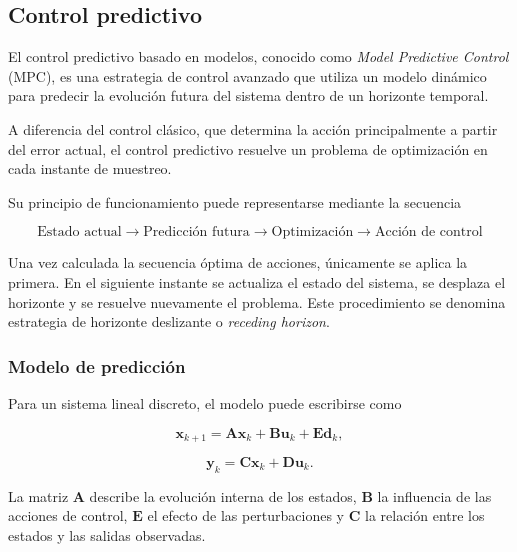 \subsection{Control predictivo}
\label{subsec:control_predictivo}

El control predictivo basado en modelos, conocido como \textit{Model Predictive Control} (MPC), es una estrategia de control avanzado que utiliza un modelo dinámico para predecir la evolución futura del sistema dentro de un horizonte temporal.

A diferencia del control clásico, que determina la acción principalmente a partir del error actual, el control predictivo resuelve un problema de optimización en cada instante de muestreo.

Su principio de funcionamiento puede representarse mediante la secuencia

\begin{equation}
\boxed{
\text{Estado actual}
\rightarrow
\text{Predicción futura}
\rightarrow
\text{Optimización}
\rightarrow
\text{Acción de control}
}
\end{equation}

Una vez calculada la secuencia óptima de acciones, únicamente se aplica la primera. En el siguiente instante se actualiza el estado del sistema, se desplaza el horizonte y se resuelve nuevamente el problema. Este procedimiento se denomina estrategia de horizonte deslizante o \textit{receding horizon}.

\subsubsection{Modelo de predicción}

Para un sistema lineal discreto, el modelo puede escribirse como

\begin{equation}
\mathbf{x}_{k+1}
=
\mathbf{A}\mathbf{x}_k
+
\mathbf{B}\mathbf{u}_k
+
\mathbf{E}\mathbf{d}_k,
\label{eq:modelo_estado_mpc}
\end{equation}

\begin{equation}
\mathbf{y}_k
=
\mathbf{C}\mathbf{x}_k
+
\mathbf{D}\mathbf{u}_k.
\label{eq:modelo_salida_mpc}
\end{equation}

La matriz $\mathbf{A}$ describe la evolución interna de los estados, $\mathbf{B}$ la influencia de las acciones de control, $\mathbf{E}$ el efecto de las perturbaciones y $\mathbf{C}$ la relación entre los estados y las salidas observadas.

